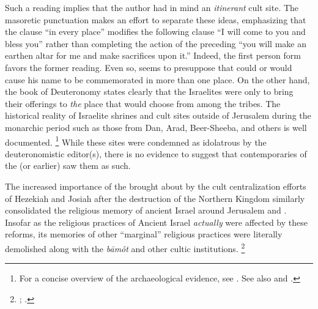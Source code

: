 Such a reading implies that the author had in mind an \emph{itinerant} cult site. The masoretic punctuation makes an effort to separate these ideas, emphasizing that the clause  ``in every place'' modifies the following clause  ``I will come to you and bless you'' rather than completing the action of the preceding  ``you will make an earthen altar for me and make sacrifices upon it.'' Indeed, the first person form  favors the former reading. Even so,  seems to presuppose that \yahweh could or would cause his name to be commemorated in more than one place. On the other hand, the book of Deuteronomy states clearly that the Israelites were only to bring their offerings to \emph{the} place that \yahweh would choose from among the tribes. The historical reality of Israelite shrines and cult sites outside of Jerusalem during the monarchic period such as those from Dan, Arad, Beer-Sheeba, and others is well documented.%
    \footnote{For a concise overview of the archaeological evidence, see \cite[319--352]{king-stager2001}. See also \cite{edelman_barton-stavrakopoulou2010} and \cite[160--181]{smith2002}.}
While these sites were condemned as idolatrous by the deuteronomistic editor(s), there is no evidence to suggest that contemporaries of the  (or earlier) saw them as such.

The increased importance of the \jerusalemtemple brought about by the cult centralization efforts of Hezekiah and Josiah after the destruction of the Northern Kingdom similarly consolidated the religious memory of ancient Israel around Jerusalem and \solomonstemple. Insofar as the religious practices of Ancient Israel \emph{actually} were affected by these reforms, its memories of other ``marginal'' religious practices were literally demolished along with the \emph{bāmôt} and other cultic institutions.
    \footnote{\Cite[182--199]{smith2002}; \cite[191--209]{romer2015}.}

